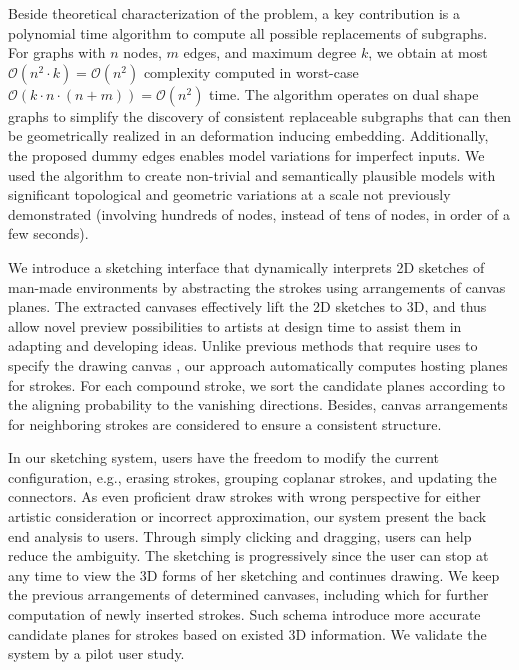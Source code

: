 Beside theoretical characterization of the problem, a key contribution is a polynomial time algorithm to compute all possible replacements of subgraphs. For graphs with $n$ nodes, $m$ edges, and maximum degree $k$, we obtain at most $\mathcal{O}(n^2 \cdot k) = \mathcal{O}(n^2)$ complexity computed in worst-case $\mathcal{O}(k \cdot n \cdot (n+m)) = \mathcal{O}(n^2)$ time. The algorithm operates on dual shape graphs to simplify the discovery of consistent replaceable subgraphs that can then be geometrically realized in an deformation inducing embedding. Additionally, the proposed dummy edges enables model variations for imperfect inputs. We used the algorithm to create non-trivial and semantically plausible models with significant topological and geometric variations at a scale not previously demonstrated (involving hundreds of nodes, instead of tens of nodes, in order of a few seconds).

%
We introduce a sketching interface that dynamically interprets 2D sketches of man-made environments by abstracting the strokes using arrangements of canvas planes. The extracted canvases effectively lift the 2D sketches to 3D, and thus allow novel preview possibilities to artists at design time to assist them in adapting and developing ideas. Unlike previous methods that require uses to specify the drawing canvas \cite{ilovesketch08, Insitu:SIGA11}, our approach automatically computes hosting planes for strokes. For each compound stroke, we sort the candidate planes according to the aligning probability to the vanishing directions. Besides, canvas arrangements for neighboring strokes are considered to ensure a consistent structure.

In our sketching system, users have the freedom to modify the current configuration, e.g., erasing strokes, grouping coplanar strokes, and updating the connectors. As even proficient draw strokes with wrong perspective for either artistic consideration or incorrect approximation, our system present the back end analysis to users. Through simply clicking and dragging, users can help reduce the ambiguity. The sketching is progressively since the user can stop at any time to view the 3D forms of her sketching and continues drawing. We keep the previous arrangements of determined canvases, including which for further computation of newly inserted strokes. Such schema introduce more accurate candidate planes for strokes based on existed 3D information. We validate the system by a pilot user study.


